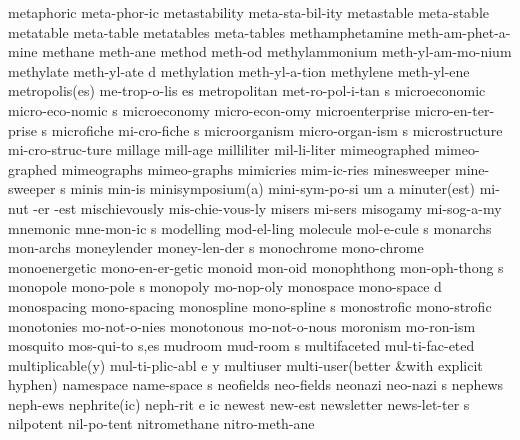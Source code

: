 \1 metaphoric		meta-phor-ic		%
\NewWordtrue
\1 metastability	meta-sta-bil-ity	%
\NewWordtrue
\1 metastable		meta-stable		%
\NewWordtrue
\1 metatable		meta-table		%
\NewWordtrue
\1 metatables		meta-tables		%
\1 methamphetamine	meth-am-phet-a-mine	%
\1 methane		meth-ane		%
\NewWordtrue
\1 method		meth-od			%
\1 methylammonium	meth-yl-am-mo-nium	%
\5 methylate		meth-yl-ate d		%
\1 methylation		meth-yl-a-tion		%
\1 methylene		meth-yl-ene		%
\2 metropolis(es)	me-trop-o-lis es
\5 metropolitan		met-ro-pol-i-tan s
\5 microeconomic	micro-eco-nomic s
\NewWordtrue
\1 microeconomy		micro-econ-omy		%
\NewWordtrue
\5 microenterprise	micro-en-ter-prise s	%
\5 microfiche		mi-cro-fiche s
\5 microorganism	micro-organ-ism s	%
\NewWordtrue
\1 microstructure	mi-cro-struc-ture	%
\1 millage		mill-age
\1 milliliter		mil-li-liter
\1 mimeographed 	mimeo-graphed
\1 mimeographs		mimeo-graphs
\1 mimicries		mim-ic-ries
\5 minesweeper		mine-sweeper s		%
\1 minis		min-is
\3 minisymposium(a)	mini-sym-po-si um a
\3 minuter(est)		mi-nut -er -est
\1 mischievously	mis-chie-vous-ly
\1 misers		mi-sers
\1 misogamy		mi-sog-a-my
\5 mnemonic		mne-mon-ic s		%
\1 modelling		mod-el-ling
\5 molecule		mol-e-cule s
\1 monarchs		mon-archs
\5 moneylender		money-len-der s
\1 monochrome		mono-chrome
\1 monoenergetic	mono-en-er-getic
\1 monoid		mon-oid
\5 monophthong		mon-oph-thong s		%
\5 monopole		mono-pole s
\1 monopoly		mo-nop-oly
\5 monospace		mono-space d		%
\NewWordtrue
\1 monospacing		mono-spacing		%
\5 monospline		mono-spline s
\1 monostrofic		mono-strofic
\1 monotonies		mo-not-o-nies
\1 monotonous		mo-not-o-nous
\1 moronism		mo-ron-ism
\5 mosquito		mos-qui-to s,es
\5 mudroom		mud-room s
\1 multifaceted 	mul-ti-fac-eted
\3 multiplicable(y)	mul-ti-plic-abl e y
\1 multiuser		multi-user\quad (better
\tabalign		&\null\quad with explicit hyphen)\cr
\5 namespace		name-space s		%
\1 neofields		neo-fields
\5 neonazi		neo-nazi s
\1 nephews		neph-ews		%
\3 nephrite(ic)		neph-rit e ic		%
\1 newest		new-est 		%
\5 newsletter		news-let-ter s
\1 nilpotent            nil-po-tent             %
\1 nitromethane		nitro-meth-ane		%
